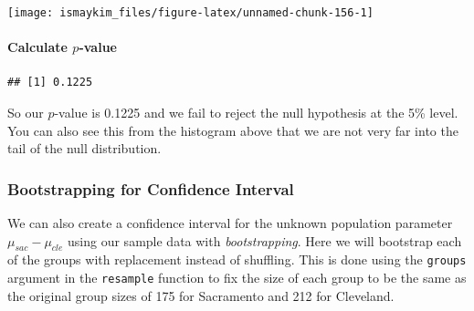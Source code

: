\documentclass[]{tufte-book}
\newenvironment{Shaded}{\begin{snugshade}}{\end{snugshade}}
\newcommand{\KeywordTok}[1]{\textcolor[rgb]{0.13,0.29,0.53}{\textbf{{#1}}}}
\newcommand{\DataTypeTok}[1]{\textcolor[rgb]{0.13,0.29,0.53}{{#1}}}
\newcommand{\DecValTok}[1]{\textcolor[rgb]{0.00,0.00,0.81}{{#1}}}
\newcommand{\StringTok}[1]{\textcolor[rgb]{0.31,0.60,0.02}{{#1}}}
\newcommand{\OtherTok}[1]{\textcolor[rgb]{0.56,0.35,0.01}{{#1}}}
\newcommand{\NormalTok}[1]{{#1}}
\begin{document}
\begin{center}\texttt{[image: ismaykim\_files/figure-latex/unnamed-chunk-156-1]} \end{center}

\paragraph{\texorpdfstring{Calculate
\(p\)-value}{Calculate p-value}}\label{calculate-p-value-3}

\begin{Shaded}
\end{Shaded}

\begin{verbatim}
## [1] 0.1225
\end{verbatim}

So our \(p\)-value is 0.1225 and we fail to reject the null hypothesis
at the 5\% level. You can also see this from the histogram above that we
are not very far into the tail of the null distribution.

\subsubsection{Bootstrapping for Confidence
Interval}\label{bootstrapping-for-confidence-interval-3}

We can also create a confidence interval for the unknown population
parameter \(\mu_{sac} - \mu_{cle}\) using our sample data with
\emph{bootstrapping}. Here we will bootstrap each of the groups with
replacement instead of shuffling. This is done using the \texttt{groups}
argument in the \texttt{resample} function to fix the size of each group
to be the same as the original group sizes of 175 for Sacramento and 212
for Cleveland.

\begin{Shaded}
\end{Shaded}
\end{document}
